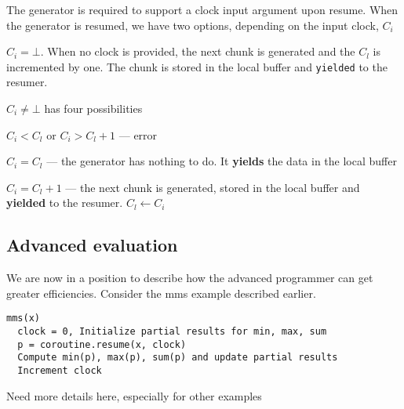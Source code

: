 The generator is required to support a clock input argument upon resume. 
When the generator is resumed, we have two options, depending on the input
clock, \(C_i\)
\be
\item 
\(C_i = \bot\). When no clock is provided, the next chunk is generated and the \(C_l\) is incremented by one. The chunk is stored in the local buffer and
{\tt yielded} to the resumer.
\item \(C_i \neq \bot\) has four possibilities
\be
\item \(C_i < C_l\) or \(C_i > C_l+1\) --- error
\item \(C_i = C_l\) --- the generator has nothing to do. 
It {\bf yields} the data in the local buffer
\item \(C_i = C_l+1\) --- the next chunk is generated, stored in the local
buffer and {\bf yielded} to the resumer. \(C_l \leftarrow C_i\)
\ee
\ee

\subsection{Advanced evaluation}

We are now in a position to describe how the advanced programmer can get greater
efficiencies. Consider the mms example described earlier. 

\begin{verbatim}
mms(x)
  clock = 0, Initialize partial results for min, max, sum
  p = coroutine.resume(x, clock)
  Compute min(p), max(p), sum(p) and update partial results
  Increment clock
\end{verbatim}


Need more details here, especially for other examples \TBC

